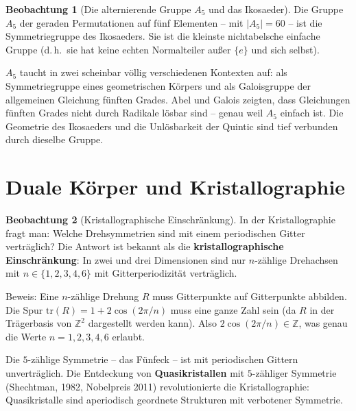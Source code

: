 ﻿\documentclass[a4paper,12pt]{report}
\theoremstyle{definition}
\newtheorem{beobachtung}{Beobachtung}
\begin{document}
\begin{beobachtung}[Die alternierende Gruppe $A_5$ und das Ikosaeder]
    Die Gruppe $A_5$ der geraden Permutationen auf fünf Elementen --
    mit $|A_5| = 60$ -- ist die Symmetriegruppe des Ikosaeders.
    Sie ist die kleinste nichtabelsche einfache Gruppe (d.\,h.\ sie hat
    keine echten Normalteiler außer $\{e\}$ und sich selbst).

    $A_5$ taucht in zwei scheinbar völlig verschiedenen Kontexten auf:
    als Symmetriegruppe eines geometrischen Körpers und als Galoisgruppe
    der allgemeinen Gleichung fünften Grades. Abel und Galois zeigten,
    dass Gleichungen fünften Grades nicht durch Radikale lösbar sind --
    genau weil $A_5$ einfach ist. Die Geometrie des Ikosaeders und die
    Unlösbarkeit der Quintic sind tief verbunden durch dieselbe Gruppe.
\end{beobachtung}


\section{Duale Körper und Kristallographie}

\begin{beobachtung}[Kristallographische Einschränkung]
    In der Kristallographie fragt man: Welche Drehsymmetrien sind mit
    einem periodischen Gitter verträglich? Die Antwort ist bekannt
    als die \textbf{kristallographische Einschränkung}: In zwei und
    drei Dimensionen sind nur $n$-zählige Drehachsen mit $n \in \{1,2,3,4,6\}$
    mit Gitterperiodizität verträglich.

    Beweis: Eine $n$-zählige Drehung $R$ muss Gitterpunkte auf
    Gitterpunkte abbilden. Die Spur $\mathrm{tr}(R) = 1 + 2\cos(2\pi/n)$
    muss eine ganze Zahl sein (da $R$ in der Trägerbasis von $\mathbb{Z}^2$
    dargestellt werden kann). Also $2\cos(2\pi/n) \in \mathbb{Z}$,
    was genau die Werte $n = 1, 2, 3, 4, 6$ erlaubt.

    Die $5$-zählige Symmetrie -- das Fünfeck -- ist mit periodischen
    Gittern unverträglich. Die Entdeckung von \textbf{Quasikristallen}
    mit $5$-zähliger Symmetrie (Shechtman, 1982, Nobelpreis 2011)
    revolutionierte die Kristallographie: Quasikristalle sind
    aperiodisch geordnete Strukturen mit verbotener Symmetrie.
\end{beobachtung}
\end{document}
